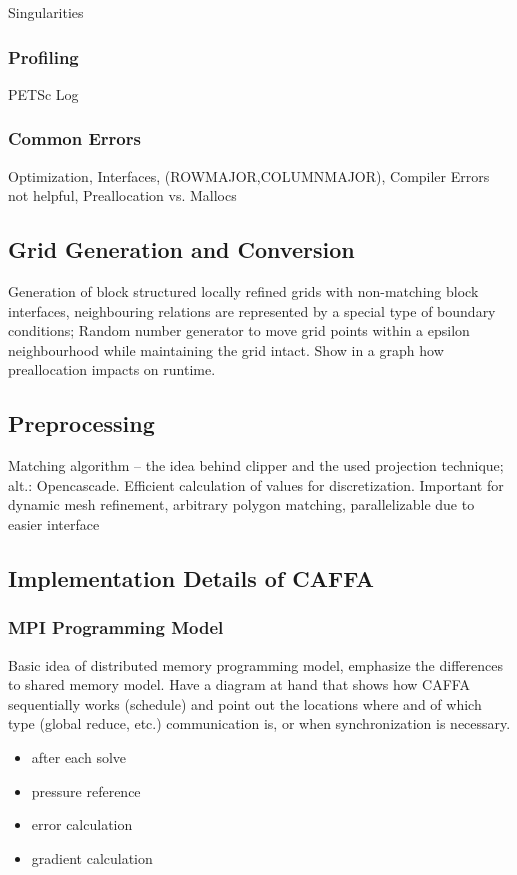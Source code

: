\documentclass[article,type=msc,colorback,accentcolor=tud2a]{tudthesis}
\begin{document}
        Singularities

      \subsubsection{Profiling}

        PETSc Log 

      \subsubsection{Common Errors}

      Optimization, Interfaces, (ROWMAJOR,COLUMNMAJOR), Compiler Errors not helpful, Preallocation vs. Mallocs

    \subsection{Grid Generation and Conversion}

      Generation of block structured locally refined grids with non-matching block interfaces, neighbouring relations are represented by a special type of boundary conditions; Random number generator to move grid points within a epsilon neighbourhood while maintaining the grid intact. Show in a graph how preallocation impacts on runtime.
    \subsection{Preprocessing}
    Matching algorithm -- the idea behind clipper and the used projection technique; alt.: Opencascade. Efficient calculation of values for discretization. Important for dynamic mesh refinement, arbitrary polygon matching, parallelizable due to easier interface

    \subsection{Implementation Details of CAFFA}

      \subsubsection{MPI Programming Model}
        Basic idea of distributed memory programming model, emphasize the differences to shared memory model. Have a diagram at hand that shows how CAFFA sequentially works (schedule) and point out the locations where and of which type (global reduce, etc.) communication is, or when synchronization is necessary.
        \begin{itemize}
          \item after each solve
          \item pressure reference
          \item error calculation
          \item gradient calculation
        \end{itemize}
        
\end{document}
